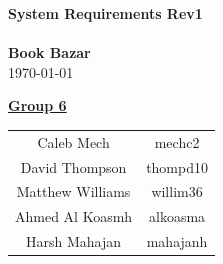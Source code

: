 \documentclass[fullpage]{article}
\begin{document}
\vspace*{\fill}
\begin{center}

  {\Huge \textbf{System Requirements Rev1}}\\
\hrulefill\\[2mm]
  {\huge \textbf{Book Bazar}}\\[2mm]
{\large \today}\\[15mm]
{\large
\underline{\textbf{Group 6}}\\
\begin{tabular}{ c c }

 Caleb Mech & mechc2\\ 
 David Thompson & thompd10\\
 Matthew Williams & willim36\\
 Ahmed Al Koasmh & alkoasma\\
 Harsh Mahajan	& mahajanh    
\end{tabular}
}

\end{center}

\vspace*{\fill}

\newpage
\begingroup
\hypersetup{hidelinks}
\tableofcontents

\listoffigures
\listoftables
\endgroup
\newpage
\end{document}
